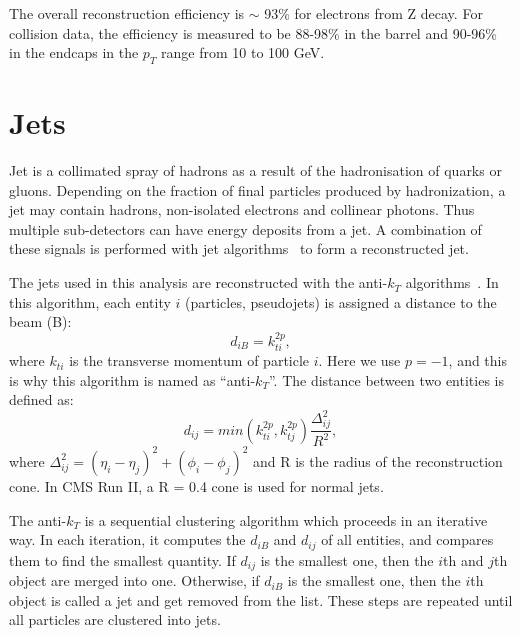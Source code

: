\documentclass[thesis.tex]{subfiles}
\begin{document}
The overall reconstruction efficiency is $\sim$ 93\% for electrons from Z decay.
For collision data, the efficiency is measured to be 88-98\% in the barrel and 90-96\% in the endcaps in the $p_T$ range from 10 to 100 GeV.

\section{Jets}
Jet is a collimated spray of hadrons as a result of the hadronisation of quarks or gluons. 
Depending on the fraction of final particles produced by hadronization, a jet may contain hadrons, non-isolated electrons and collinear photons. 
Thus multiple sub-detectors can have energy deposits from a jet.
A combination of these signals is performed with jet algorithms~\cite{FastJet} to form a reconstructed jet. 

The jets used in this analysis are reconstructed with the anti-$k_T$ algorithms~\cite{AntiKT}. 
In this algorithm, each entity $i$ (particles, pseudojets) is assigned a distance to the beam (B): 
\begin{equation}
	d_{iB} = k_{ti}^{2p},
\end{equation}
where $k_{ti}$ is the transverse momentum of particle $i$. Here we use $p = -1$, and this is why this algorithm is named as ``anti-$k_T$''. 
The distance between two entities is defined as:
\begin{equation}
	d_{ij} = min(k_{ti}^{2p}, k_{tj}^{2p})\frac{\Delta_{ij}^2}{R^2},
\end{equation}
where $\Delta_{ij}^2 = (\eta_i - \eta_j)^2 + (\phi_i - \phi_j)^2$ and R is the radius of the reconstruction cone. 
In CMS Run II, a R = 0.4 cone is used for normal jets. 

The anti-$k_T$ is a sequential clustering algorithm which proceeds in an iterative way.
In each iteration, it computes the $d_{iB}$ and $d_{ij}$ of all entities, and compares them to find the smallest quantity.  
If $d_{ij}$ is the smallest one, then the $i$th and $j$th object are merged into one. 
Otherwise, if $d_{iB}$ is the smallest one, then the $i$th object is called a jet and get removed from the list. 
These steps are repeated until all particles are clustered into jets. 
\end{document}
